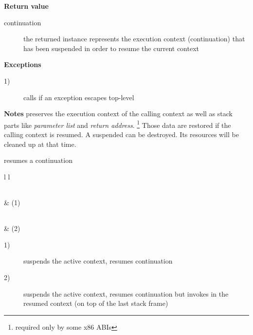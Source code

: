 {\bfseries Return value}
\begin{description}
    \item[continuation] the returned instance represents the execution context
                        (continuation) that has been suspended in order to
                        resume the current context
\end{description}

{\bfseries Exceptions}
\begin{description}
    \item[1)] calls  if an exception escapes top-level
              \\
\end{description}

{\bfseries Notes}
\newline
\call preserves the execution context of the calling context as well as stack
parts like \emph{parameter list} and \emph{return address}.
\footnote{required only by some x86 ABIs} Those data are restored if the calling
context is resumed.
\newline
A suspended  can be destroyed. Its resources will be cleaned
up at that time.



resumes a continuation\\

\begin{tabular}{ l l }
    \midrule

    \\
     & (1)\\

    \midrule

    \\
     & (2)\\

    \midrule
\end{tabular}

\begin{description}
    \item[1)] suspends the active context, resumes continuation 
    \item[2)] suspends the active context, resumes continuation  but
              invokes  in the resumed context (on top of the
              last stack frame)
\end{description}

